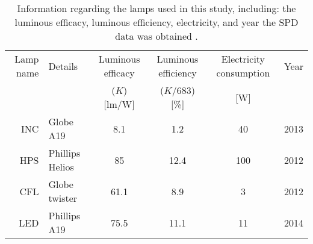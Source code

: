 

\begin{table}
\centering %
\caption{Information regarding the lamps used in this study, including: 
the luminous efficacy, luminous efficiency, electricity,
and year the SPD data was obtained \cite{aube2013}.}
\begin{tabular}{r l c c c c}
  \toprule
  Lamp name 
      & Details 
      & Luminous efficacy 
      & Luminous efficiency
      & Electricity consumption 
      & Year  \\
  
      &
      & ($K$) [lm/W]
      & ($K/683$) [\%]
      & [W] 
      & \\
  \midrule
  INC
      & Globe A19
      & 8.1
      & 1.2
      & 40
      & 2013\\
  HPS   
      & Phillips Helios
      & 85
      & 12.4
      & 100
      & 2012 \\
  CFL
      & Globe twister
      & 61.1
      & 8.9
      & 3
      & 2012 \\
  LED
      & Phillips A19
      & 75.5
      & 11.1
      & 11
      & 2014 \\
  \bottomrule
\end{tabular}
\label{tab:lamps}
\end{table}

